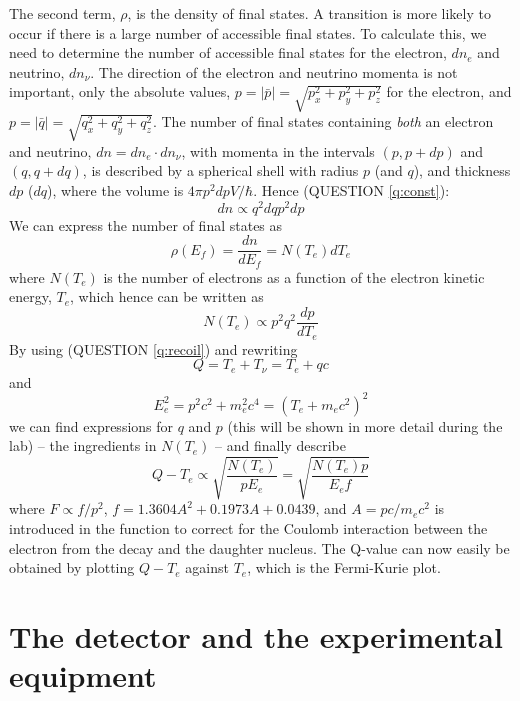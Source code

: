 \documentclass[a4,11pt, notitlepage]{article}
\begin{document}
The second term, $\rho$, is the density of final states. A transition is more likely to occur if there is a large number of accessible final states. To calculate this, we need to determine the number of accessible final states for the electron, $dn_e$ and neutrino, $dn_{\nu}$. The direction of the electron and neutrino momenta is not important, only the absolute values, $p=|\bar p| = \sqrt{p_x^2+p_y^2+p_z^2}$ for the electron, and $p=|\bar q| = \sqrt{q_x^2+q_y^2+q_z^2}$. The number of final states containing \textit{both} an electron and neutrino, $dn = dn_e\cdot dn_{\nu}$, with momenta in the intervals $(p, p+dp)$ and $(q, q+dq)$, is described by a spherical shell with radius $p$ (and $q$), and thickness $dp$ ($dq$), where the volume is $4\pi p^2 dpV/\hbar$. Hence (QUESTION \ref{q:const}): 
\begin{equation}
dn\propto q^2 dq p^2 dp 
\end{equation} 
We can express the number of final states as 
\begin{equation}
\rho(E_f)=\frac{dn}{dE_f}=N(T_e)dT_e
\end{equation}
where $N(T_e)$ is the number of electrons as a function of the electron kinetic energy, $T_e$, which hence can be written as 
\begin{equation}
N(T_e)\propto p^2q^2\frac{dp}{dT_e} 
\end{equation}
By using (QUESTION \ref{q:recoil}) and rewriting 
\begin{equation}
Q=T_e + T_{\nu} = T_e + qc
\end{equation} 
and
\begin{equation}
E_e^2 = p^2c^2+m_e^2c^4=(T_e+m_ec^2)^2
\end{equation} 
we can find expressions for $q$ and $p$ (this will be shown in more detail during the lab) -- the ingredients in $N(T_e)$ -- and finally describe 
\begin{equation}
Q-T_e \propto \sqrt{\frac{N(T_e)}{pE_e}} = \sqrt{\frac{N(T_e)p}{E_ef}}
\label{eq:f}
\end{equation}
where $F\propto f/p^2$, $f=1.3604A^2+0.1973A+0.0439$, and $A=pc/m_ec^2$ is introduced in the function to correct for the Coulomb interaction between the electron from the decay and the daughter nucleus. 
The Q-value can now easily be obtained by plotting $Q-T_e$ against $T_e$, which is the Fermi-Kurie plot.



\section{The detector and the experimental equipment}
\end{document}
